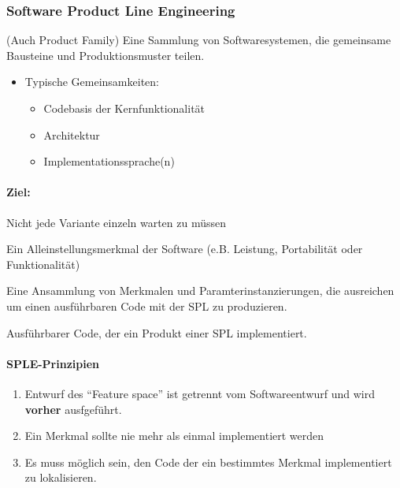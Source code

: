 \documentclass[ngerman,color=3b]{tuda_summary}
\begin{document}
\subsubsection{Software Product Line Engineering}
\begin{definition} (Auch Product Family)
    Eine Sammlung von Softwaresystemen, die gemeinsame Bausteine und Produktionsmuster teilen.
\end{definition}
\begin{itemize}
    \item Typische Gemeinsamkeiten:\begin{itemize}
              \item Codebasis der Kernfunktionalität
              \item Architektur
              \item Implementationssprache(n)
          \end{itemize}
\end{itemize}
\paragraph{Ziel:} Nicht jede Variante einzeln warten zu müssen
\clearpage
\begin{definition}
    Ein Alleinstellungsmerkmal der Software (e.B. Leistung, Portabilität oder Funktionalität)
\end{definition}
\begin{definition}[Produkt]
    Eine Ansammlung von Merkmalen und Paramterinstanzierungen, die ausreichen um einen ausführbaren Code mit der SPL zu produzieren.
\end{definition}
\begin{definition}
    Ausführbarer Code, der ein Produkt einer SPL implementiert.
\end{definition}

\paragraph{SPLE-Prinzipien}
\begin{enumerate}
    \item Entwurf des \enquote{Feature space} ist getrennt vom Softwareentwurf und wird \textbf{vorher} ausfgeführt.
    \item Ein Merkmal sollte nie mehr als einmal implementiert werden
    \item Es muss möglich sein, den Code der ein bestimmtes Merkmal implementiert zu lokalisieren.
\end{enumerate}
\end{document}
